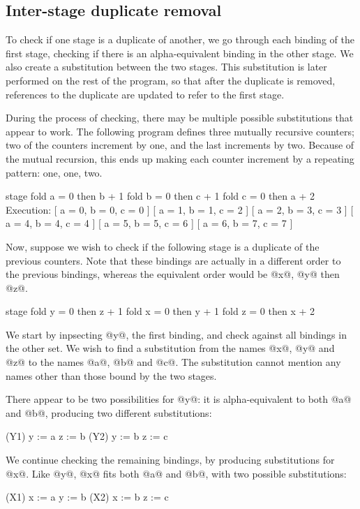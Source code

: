 \subsection{Inter-stage duplicate removal}
To check if one stage is a duplicate of another, we go through each binding of the first stage, checking if there is an alpha-equivalent binding in the other stage.
We also create a substitution between the two stages.
This substitution is later performed on the rest of the program, so that after the duplicate is removed, references to the duplicate are updated to refer to the first stage.

During the process of checking, there may be multiple possible substitutions that appear to work.
The following program defines three mutually recursive counters; two of the counters increment by one, and the last increments by two.
Because of the mutual recursion, this ends up making each counter increment by a repeating pattern: one, one, two.
\begin{code}
stage {
  fold a = 0 then b + 1
  fold b = 0 then c + 1
  fold c = 0 then a + 2
}
Execution:
[ a = 0, b = 0, c = 0 ]
[ a = 1, b = 1, c = 2 ]
[ a = 2, b = 3, c = 3 ]
[ a = 4, b = 4, c = 4 ]
[ a = 5, b = 5, c = 6 ]
[ a = 6, b = 7, c = 7 ]
\end{code}

Now, suppose we wish to check if the following stage is a duplicate of the previous counters.
Note that these bindings are actually in a different order to the previous bindings, whereas the equivalent order would be @x@, @y@ then @z@.
\begin{code}
stage {
  fold y = 0 then z + 1
  fold x = 0 then y + 1
  fold z = 0 then x + 2
}
\end{code}

We start by inpsecting @y@, the first binding, and check against all bindings in the other set.
We wish to find a substitution from the names @x@, @y@ and @z@ to the names @a@, @b@ and @c@.
The substitution cannot mention any names other than those bound by the two stages.

There appear to be two possibilities for @y@: it is alpha-equivalent to both @a@ and @b@, producing two different substitutions:
\begin{code}
(Y1)
y := a
z := b
(Y2)
y := b
z := c
\end{code}

We continue checking the remaining bindings, by producing substitutions for @x@.
Like @y@, @x@ fits both @a@ and @b@, with two possible substitutions:
\begin{code}
(X1)
x := a
y := b
(X2)
x := b
z := c
\end{code}

